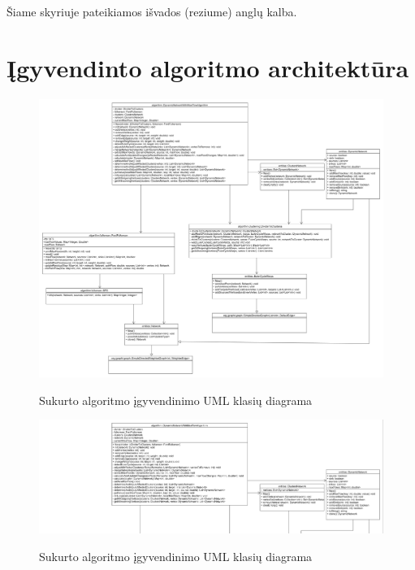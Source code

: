 \documentclass{VUMIFInfBakalaurinis}
\begin{document}
Šiame skyriuje pateikiamos išvados (reziume) anglų kalba.


\printbibliography[heading=bibintoc] %

\appendix  %

\section{Įgyvendinto algoritmo architektūra}
\begin{figure}[h]
	\caption{Sukurto algoritmo įgyvendinimo UML klasių diagrama}
	\centering
	\includegraphics[width=1.1\textwidth, angle=90]{img/architecture.png}
	\label{fig:architecture}
\end{figure}

\begin{figure}[h]
	\caption{Sukurto algoritmo įgyvendinimo UML klasių diagrama}
	\centering
	\includegraphics[width=1.5\textwidth, height=0.6\textheight, angle=90]{img/architecture1.png}
	\label{fig:architecture1}
\end{figure}
\end{document}
